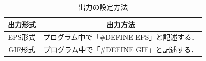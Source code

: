 \begin{table}[t]
  \begin{center}
    \caption{出力の設定方法}
    \label{tb:toggle_outputs}
    \begin{tabular}{c|c}
      \hline \hline
      出力形式 & 出力方法 \\ \hline
      EPS形式  & プログラム中で「\#DEFINE EPS」と記述する．\\ \hline
      GIF形式  & プログラム中で「\#DEFINE GIF」と記述する．\\ \hline
    \end{tabular}
  \end{center}
\end{table}
